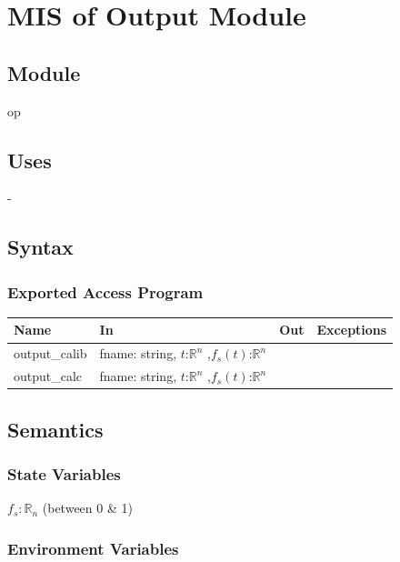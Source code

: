 \documentclass[12pt, titlepage]{article}
\begin{document}
\newpage

\section{MIS of Output Module} \label{Output}

\subsection{Module}

op

\subsection{Uses}

-
\subsection{Syntax}


\subsubsection{Exported Access Program}

\begin{center}
\begin{tabular}{p{3cm} p{6cm} p{2cm} p{2cm}}
\hline
\textbf{Name} & \textbf{In} & \textbf{Out} & \textbf{Exceptions} \\
\hline
output\_calib & fname: string, $t$:$\mathbb{R}^n$ ,$f_{s}(t)$:$\mathbb{R}^n$\\
output\_calc & fname: string, $t$:$\mathbb{R}^n$ ,$f_{s}(t)$:$\mathbb{R}^n$\\                 
\hline
\end{tabular}
\end{center}

\subsection{Semantics}

\subsubsection{State Variables}

$f_s: \mathbb{R}_n$ (between 0 \& 1)

\subsubsection{Environment Variables}
\end{document}
